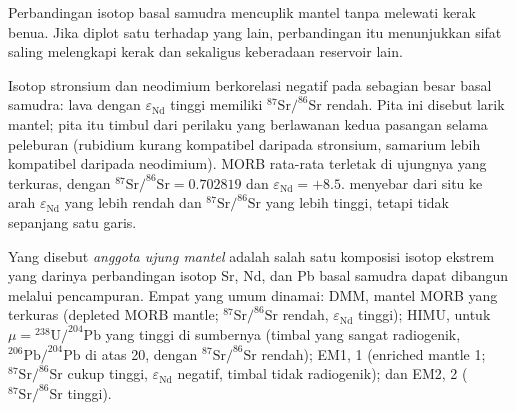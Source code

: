 Perbandingan isotop basal samudra mencuplik mantel tanpa melewati
kerak benua. Jika diplot satu terhadap yang lain, perbandingan itu menunjukkan
sifat saling melengkapi kerak dan  sekaligus keberadaan reservoir
lain.

Isotop stronsium dan neodimium berkorelasi negatif pada sebagian besar basal samudra:
lava dengan $\varepsilon_{\mathrm{Nd}}$ tinggi memiliki
$^{87}\mathrm{Sr}/^{86}\mathrm{Sr}$ rendah. Pita ini disebut larik mantel; pita itu timbul
dari perilaku yang berlawanan kedua pasangan selama peleburan (rubidium kurang
kompatibel daripada stronsium, samarium lebih kompatibel daripada neodimium). MORB
rata-rata terletak di ujungnya yang terkuras, dengan $^{87}\mathrm{Sr}/^{86}\mathrm{Sr} = 0.702819$ dan
$\varepsilon_{\mathrm{Nd}} = +8.5$.  menyebar dari situ ke arah
$\varepsilon_{\mathrm{Nd}}$ yang lebih rendah dan $^{87}\mathrm{Sr}/^{86}\mathrm{Sr}$ yang lebih tinggi, tetapi tidak
sepanjang satu garis.

\begin{definition}\label{def:b2:isotope-geochemistry:end-members}
Yang disebut \emph{anggota ujung mantel} adalah salah satu komposisi
isotop ekstrem yang darinya perbandingan isotop Sr, Nd, dan Pb basal
samudra dapat dibangun melalui pencampuran. Empat yang umum dinamai: DMM, mantel
MORB yang terkuras (depleted MORB mantle; $^{87}\mathrm{Sr}/^{86}\mathrm{Sr}$ rendah, $\varepsilon_{\mathrm{Nd}}$ tinggi);
HIMU, untuk $\mu = {}^{238}\mathrm{U}/^{204}\mathrm{Pb}$ yang tinggi di sumbernya
(timbal yang sangat radiogenik, $^{206}\mathrm{Pb}/^{204}\mathrm{Pb}$ di atas 20, dengan
$^{87}\mathrm{Sr}/^{86}\mathrm{Sr}$ rendah); EM1,  1 (enriched mantle 1; $^{87}\mathrm{Sr}/^{86}\mathrm{Sr}$
cukup tinggi, $\varepsilon_{\mathrm{Nd}}$ negatif, timbal tidak
radiogenik); dan EM2,  2 ($^{87}\mathrm{Sr}/^{86}\mathrm{Sr}$ tinggi).
\end{definition}

